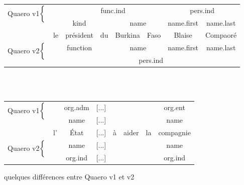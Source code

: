 \documentclass[citation\_needed]{subfiles}
\begin{document}
\begin{figure}
\centering
\begin{tabular}{cccccccc}
\multirow{2}{*}{Quaero v1$\left\{\vphantom{\begin{tabular}{c}.\\.\end{tabular}}\right.$} &    & \multicolumn{4}{c}{\cellcolor{red}func.ind}                                & \multicolumn{2}{c}{\cellcolor{yellow!75}pers.ind}\\
                           &    & \cellcolor{blue!50}kind     &     & \multicolumn{2}{c}{\cellcolor{green!75}name} & \cellcolor{red!33}name.first & \cellcolor{red!66}name.last\\
                           & le & président                   & du  & Burkina & Faso                               & Blaise     & Compaoré\\
\multirow{2}{*}{Quaero v2$\left\{\vphantom{\begin{tabular}{c}.\\.\end{tabular}}\right.$} &    & \cellcolor{teal!66}function &     & \multicolumn{2}{c}{\cellcolor{green!75}name} & \cellcolor{red!33}name.first & \cellcolor{red!66}name.last\\
                           &    & \multicolumn{6}{c}{\cellcolor{yellow!75}pers.ind}\\
\end{tabular}

~\\~\\

\begin{tabular}{cccccccc}
\multirow{2}{*}{Quaero v1$\left\{\vphantom{\begin{tabular}{c}.\\.\end{tabular}}\right.$} & & \cellcolor{blue!50}org.adm & [...] & & & & \cellcolor{teal!66}org.ent \\
 & & \cellcolor{red!66}name & [...] & & & & \cellcolor{red!66}name \\
 & l' & État & [...] & à & aider & la & compagnie \\
\multirow{2}{*}{Quaero v2$\left\{\vphantom{\begin{tabular}{c}.\\.\end{tabular}}\right.$}  & & \cellcolor{red!66}name & [...] & & & & \cellcolor{red!66}name \\
& & \cellcolor{green!66}org.ind & [...] & & & & \cellcolor{green!66}org.ind \\
\end{tabular}
\caption{quelques différences entre Quaero v1 et v2}
\label{fig:Quaerov1-vs-v2}
\end{figure}
\end{document}
